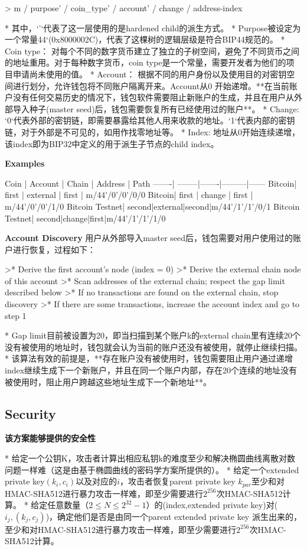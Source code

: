 > m / purpose' / coin_type' / account' / change / address-index

* 其中，`'`代表了这一层使用的是hardened child的派生方式。
* Purpose被设定为一个常量44‘(0x8000002C)，代表了这棵树的逻辑层级是符合BIP44规范的。
* Coin type： 对每个不同的数字货币建立了独立的子树空间，避免了不同货币之间的地址重用。对于每种数字货币，coin type是一个常量，需要开发者为他们的项目申请尚未使用的值。
* Account： 根据不同的用户身份以及使用目的对密钥空间进行划分，允许钱包将不同账户隔离开来。Account从0 开始递增。**在当前账户没有任何交易历史的情况下，钱包软件需要阻止新账户的生成，并且在用户从外部导入种子(master seed)后，钱包需要恢复所有已经使用过的账户**。
* Change: `0`代表外部的密钥链，即需要暴露给其他人用来收款的地址。`1`代表内部的密钥链，对于外部是不可见的，如用作找零地址等。
* Index: 地址从0开始连续递增，该index即为BIP32中定义的用于派生子节点的child index。

\textbf{Examples}

Coin   | Account | Chain | Address | Path 
-------| --------|-------|---------|------
Bitcoin| first   | external | first | m/44'/0'/0'/0/0 
Bitcoin| first   | change | first | m/44'/0'/0'/1/0 
Bitcoin Testnet| second|external|second|m/44'/1'/1'/0/1
Bitcoin Testnet| second|change|first|m/44'/1'/1'/1/0

\textbf{Account Discovery}
用户从外部导入master seed后，钱包需要对用户使用过的账户进行恢复，过程如下：

>* Derive the first account's node (index = 0)
>* Derive the external chain node of this account
>* Scan addresses of the external chain; respect the gap limit described below
>* If no transactions are found on the external chain, stop discovery
>* If there are some transactions, increase the account index and go to step 1

* Gap limit目前被设置为20，即当扫描到某个账户k的external chain里有连续20个没有被使用的地址时，钱包就会认为当前的账户还没有被使用，就停止继续扫描。
* 该算法有效的前提是，**存在账户没有被使用时，钱包需要阻止用户通过递增index继续生成下一个新账户，并且在同一个账户内部，存在20个连续的地址没有被使用时，阻止用户跨越这些地址生成下一个新地址**。


\subsection{ Security}
\textbf{该方案能够提供的安全性}

* 给定一个公钥K，攻击者计算出相应私钥k的难度至少和解决椭圆曲线离散对数问题一样难（这是由基于椭圆曲线的密码学方案所提供的）。
* 给定一个extended private key$(k_i,c_i)$以及对应的$i$，攻击者恢复parent private key $k_{par}$至少和对HMAC-SHA512进行暴力攻击一样难，即至少需要进行$2^{256}$次HMAC-SHA512计算。
* 给定任意数量（$2\leq N\leq 2^{32}-1$）的(index,extended private key)对($i_j,(k_j,c_j)$)，确定他们是否是由同一个parent extended private key 派生出来的，至少和对HMAC-SHA512进行暴力攻击一样难，即至少需要进行$2^{256}$次HMAC-SHA512计算。

